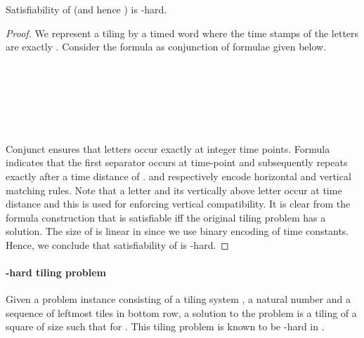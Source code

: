 \documentclass{llncs}
\newcommand{\expspace}{\mbox{}}
\newcommand{\nexptime}{\mbox{}}
\begin{document}
\begin{theorem}\label{theo:expspacehard} 
Satisfiability of  (and hence ) is \expspace-hard.
\end{theorem}
\begin{proof}
We represent a tiling  by a timed word  where the time stamps of the letters are exactly . Consider the  formula  as conjunction  of formulae given below. 

\medskip

\noindent \\
\\
\\
\\ 
\\

\medskip

Conjunct  ensures that letters occur exactly at integer time points. Formula  indicates that the first separator  occurs at time-point  and subsequently  repeats exactly after a time distance of .  and  respectively encode horizontal and vertical matching rules.
 Note that a letter and its vertically above letter occur at time distance  and this is used for enforcing vertical compatibility.
It is clear from the formula construction that  
is satisfiable iff the original tiling problem has a solution. The size of  is linear in  since we use binary encoding of time constants. Hence, we conclude that satisfiability of  is \expspace-hard.
\end{proof}

\paragraph{\nexptime-hard tiling problem} Given a problem instance consisting of a tiling system
, a natural number  and a sequence  of leftmost  tiles in bottom row, a solution to the problem is a tiling  of a square of size  such that  for . This tiling problem is known to be \nexptime-hard in .
\end{document}

